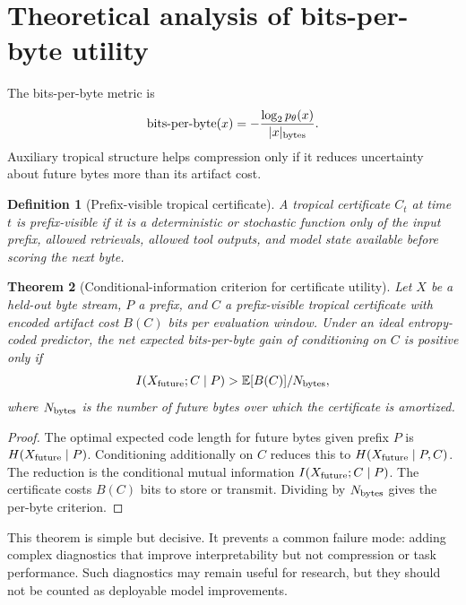 \documentclass[11pt]{article}
\newtheorem{definition}{Definition}[section]
\newtheorem{theorem}[definition]{Theorem}
\newcommand{\E}{\mathbb{E}}
\newcommand{\bpb}{\operatorname{bits\mbox{-}per\mbox{-}byte}}
\begin{document}
\section{Theoretical analysis of bits-per-byte utility}

The bits-per-byte metric is
\begin{equation}
\bpb(x)=-\frac{\log_2p_\theta(x)}{|x|_{\rm bytes}}.
\end{equation}
Auxiliary tropical structure helps compression only if it reduces uncertainty about future bytes more than its artifact cost.

\begin{definition}[Prefix-visible tropical certificate]
A tropical certificate \(C_t\) at time \(t\) is prefix-visible if it is a deterministic or stochastic function only of the input prefix, allowed retrievals, allowed tool outputs, and model state available before scoring the next byte.
\end{definition}

\begin{theorem}[Conditional-information criterion for certificate utility]
Let \(X\) be a held-out byte stream, \(P\) a prefix, and \(C\) a prefix-visible tropical certificate with encoded artifact cost \(B(C)\) bits per evaluation window.  Under an ideal entropy-coded predictor, the net expected bits-per-byte gain of conditioning on \(C\) is positive only if
\begin{equation}
I(X_{\rm future};C\mid P)>\E[B(C)]/N_{\rm bytes},
\end{equation}
where \(N_{\rm bytes}\) is the number of future bytes over which the certificate is amortized.
\end{theorem}

\begin{proof}
The optimal expected code length for future bytes given prefix \(P\) is \(H(X_{\rm future}\mid P)\).  Conditioning additionally on \(C\) reduces this to \(H(X_{\rm future}\mid P,C)\).  The reduction is the conditional mutual information \(I(X_{\rm future};C\mid P)\).  The certificate costs \(B(C)\) bits to store or transmit.  Dividing by \(N_{\rm bytes}\) gives the per-byte criterion.
\end{proof}

This theorem is simple but decisive.  It prevents a common failure mode: adding complex diagnostics that improve interpretability but not compression or task performance.  Such diagnostics may remain useful for research, but they should not be counted as deployable model improvements.
\end{document}
